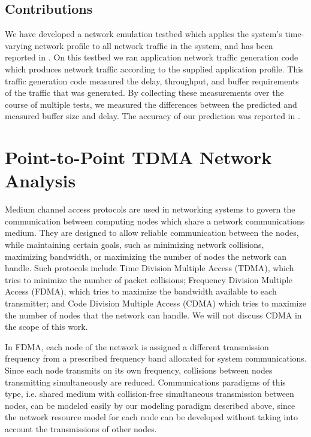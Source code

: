 \subsection{Contributions}
We have developed a network emulation testbed which applies the system's time-varying network profile to all network traffic in the system, and has been reported in \cite{ISIS_F6_CYPHY:14}.  On this testbed we ran application network traffic generation code which produces network traffic according to the supplied application profile.  This traffic generation code measured the delay, throughput, and buffer requirements of the traffic that was generated.  By collecting these measurements over the course of multiple tests, we measured the differences between the predicted and measured buffer size and delay.  The accuracy of our prediction was reported in \cite{ISIS_F6_CYPHY:14}.

\newpage

\section{Point-to-Point TDMA Network Analysis}
\label{sec:tdma}

Medium channel access protocols are used in networking systems to govern the communication between computing nodes which share a network communications medium.  They are designed to allow reliable communication between the nodes, while maintaining certain goals, such as minimizing network collisions, maximizing bandwidth, or maximizing the number of nodes the network can handle.  Such protocols include Time Division Multiple Access (TDMA), which tries to minimize the number of packet collisions; Frequency Division Multiple Access (FDMA), which tries to maximize the bandwidth available to each transmitter; and Code Division Multiple Access (CDMA) which tries to maximize the number of nodes that the network can handle\cite{jung1993advantagesCDMAFDMATDMA}.  We will not discuss CDMA in the scope of this work.  

In FDMA, each node of the network is assigned a different transmission frequency from a prescribed frequency band allocated for system communications.  Since each node transmits on its own frequency, collisions between nodes transmitting simultaneously are reduced.  Communications paradigms of this type, i.e. shared medium with collision-free simultaneous transmission between nodes, can be modeled easily by our \shorttool modeling paradigm described above, since the network resource model for each node can be developed without taking into account the transmissions of other nodes.  

